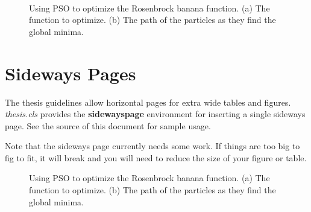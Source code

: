 \documentclass[master]{thesis}
\begin{document}
\vspace{-1em}
\begin{figure}[p!] %
     \\


    \caption[Using PSO to optimize the Rosenbrock banana function.]{Using PSO to optimize the Rosenbrock banana function.  (a)  The function to optimize.  (b)  The path of the particles as they find the global minima.}

    \label{fig:pso.subfloat}
\end{figure}

\section{Sideways Pages}

The thesis guidelines allow horizontal pages for extra wide tables and figures.  \textit{thesis.cls} provides the \textbf{sidewayspage} environment for inserting a single sideways page.  See the source of this document for sample usage.

Note that the sideways page currently needs some work.  If things are too big to fig to fit, it will break and you will need to reduce the size of your figure or table.

\begin{sidewayspage} %
    \begin{figure} %
         \hfill
        \caption[PSO on sideways page.]{Using PSO to optimize the Rosenbrock banana function.  (a)  The function to optimize.  (b)  The path of the particles as they find the global minima.}
    \end{figure}
\end{sidewayspage}
\end{document}

